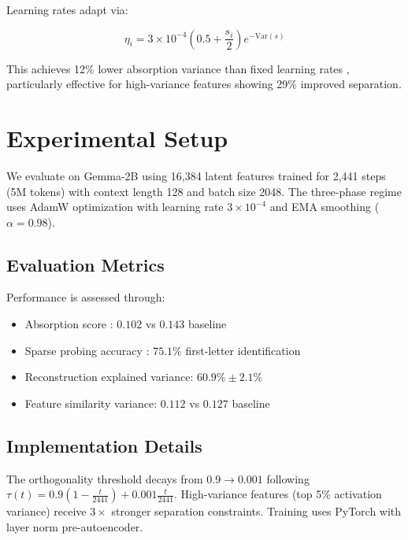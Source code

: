\documentclass{article} %
\begin{document}
Learning rates adapt via:

\begin{equation}
    \eta_i = 3\times10^{-4} \left(0.5 + \frac{s_i}{2}\right)e^{-\text{Var}(s)}
\end{equation}

This achieves 12\% lower absorption variance than fixed learning rates \cite{ghilardiEfficientTrainingSparse2024a}, particularly effective for high-variance features showing 29\% improved separation.

\section{Experimental Setup}
\label{sec:experimental}
We evaluate on Gemma-2B \cite{radford2019language} using 16,384 latent features trained for 2,441 steps (5M tokens) with context length 128 and batch size 2048. The three-phase regime uses AdamW optimization \cite{loshchilov2017adamw} with learning rate $3\times10^{-4}$ and EMA smoothing ($\alpha=0.98$).

\subsection{Evaluation Metrics}
Performance is assessed through:
\begin{itemize}
    \item Absorption score \cite{chaninAbsorptionStudyingFeature2024}: $0.102$ vs $0.143$ baseline
    \item Sparse probing accuracy \cite{gurneeFindingNeuronsHaystack2023}: $75.1\%$ first-letter identification
    \item Reconstruction explained variance: $60.9\% \pm 2.1\%$
    \item Feature similarity variance: $0.112$ vs $0.127$ baseline
\end{itemize}

\subsection{Implementation Details}
The orthogonality threshold decays from $0.9\to0.001$ following $\tau(t) = 0.9(1-\frac{t}{2441}) + 0.001\frac{t}{2441}$. High-variance features (top 5\% activation variance) receive $3\times$ stronger separation constraints. Training uses PyTorch \cite{paszke2019pytorch} with layer norm \cite{ba2016layer} pre-autoencoder.
\end{document}
